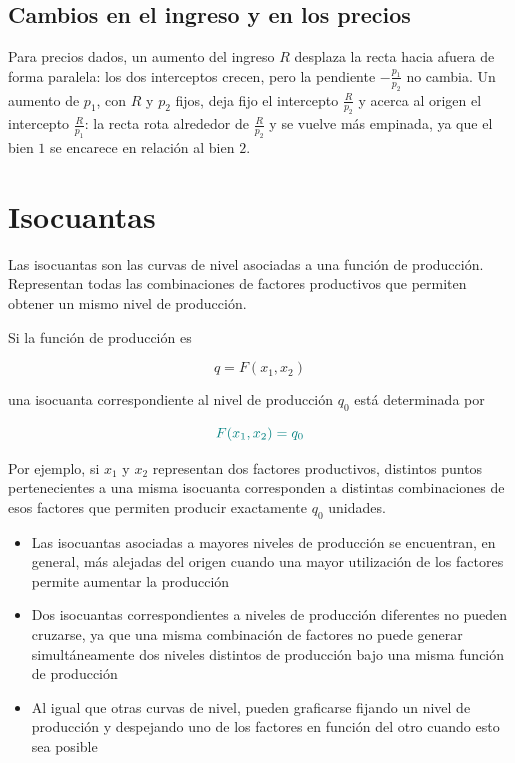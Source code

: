 \documentclass{article}
\begin{document}
\subsection*{Cambios en el ingreso y en los precios}

Para precios dados, un aumento del ingreso \(R\) desplaza la recta hacia afuera de forma {\color{teal}paralela}: los dos interceptos crecen, pero la pendiente \(-\frac{p_1}{p_2}\) no cambia. Un aumento de \(p_1\), con \(R\) y \(p_2\) fijos, deja fijo el intercepto \(\frac{R}{p_2}\) y acerca al origen el intercepto \(\frac{R}{p_1}\): la recta {\color{teal}rota} alrededor de \(\frac{R}{p_2}\) y se vuelve más empinada, ya que el bien \(1\) se encarece en relación al bien \(2\).


\section*{Isocuantas}

Las {\color{teal}isocuantas} son las curvas de nivel asociadas a una función de producción. Representan todas las combinaciones de factores productivos que permiten obtener un mismo nivel de producción.

Si la función de producción es

\[
q=F(x_1,x_2)
\]

una isocuanta correspondiente al nivel de producción \(q_0\) está determinada por

\[
{\color{teal}
F(x_1,x_2)=q_0
}
\]

Por ejemplo, si \(x_1\) y \(x_2\) representan dos factores productivos, distintos puntos pertenecientes a una misma isocuanta corresponden a distintas combinaciones de esos factores que permiten producir exactamente \(q_0\) unidades.

\begin{itemize}
    \item Las isocuantas asociadas a {\color{teal}mayores niveles de producción} se encuentran, en general, más alejadas del origen cuando una mayor utilización de los factores permite aumentar la producción

    \item Dos isocuantas correspondientes a niveles de producción diferentes {\color{teal}no pueden cruzarse}, ya que una misma combinación de factores no puede generar simultáneamente dos niveles distintos de producción bajo una misma función de producción

    \item Al igual que otras curvas de nivel, pueden graficarse fijando un nivel de producción y despejando uno de los factores en función del otro cuando esto sea posible
\end{itemize}
\end{document}
